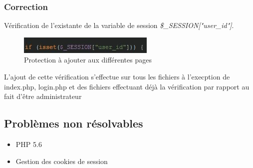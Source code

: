 \documentclass[12pt]{article}
\begin{document}
\subsubsection{Correction}
Vérification de l'existante de la variable de session \textit{\$\_SESSION["user\_id"]}.
\begin{figure}[H]
\centering
\includegraphics[width=\linewidth]{images/protectionPage.jpg}
\caption{Protection à ajouter aux différentes pages}
\end{figure}
L'ajout de cette vérification s'effectue sur tous les fichiers à l'execption de index.php, login.php et des fichiers effectuant déjà la vérification par rapport au fait d'être administrateur


\subsection{Problèmes non résolvables}
\begin{itemize}
\item PHP 5.6
\item Gestion des cookies de session
\end{itemize}
\end{document}
